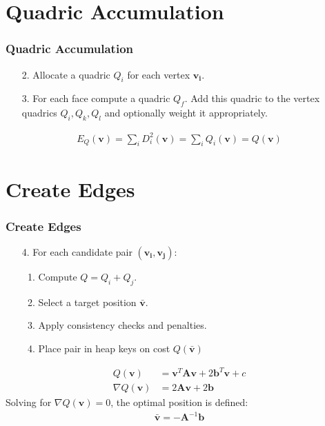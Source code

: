 \documentclass[
	10pt,
	t		%
]{beamer}
\begin{document}
\section{Quadric Accumulation}
\begin{frame}
\frametitle{Quadric Accumulation}
\centering
\begin{enumerate}
\item [2.] Allocate a quadric $Q_i$ for each vertex $\mathbf{v_i}$.
\item [3.] For each face compute a quadric $Q_f$. Add this quadric to the vertex quadrics $Q_i, Q_k, Q_l$ and optionally weight it appropriately.
\end{enumerate}
\begin{align}
E_Q(\mathbf{v}) = \sum_{i} D_i^2(\mathbf{v}) = \sum_{i} Q_i(\mathbf{v}) = Q(\mathbf{v})
\end{align}
\end{frame}

\section{Create Edges}
\begin{frame}
\frametitle{Create Edges}
\centering
\begin{enumerate}
\item [4.] For each candidate pair $(\mathbf{v_i}, \mathbf{v_j})$:
\begin{enumerate}
\item Compute $Q = Q_i + Q_j$.
\item Select a target position $\mathbf{\bar{v}}$.
\item Apply consistency checks and penalties.
\item Place pair in heap keys on cost $Q(\mathbf{\bar{v}})$
\end{enumerate}
\end{enumerate}

\begin{align}
Q(\mathbf{v}) &= \mathbf{v}^T\mathbf{A}\mathbf{v} + 2\mathbf{b}^T\mathbf{v} + c\\
\nabla Q(\mathbf{v}) &= 2\mathbf{A}\mathbf{v} + 2 \mathbf{b}
\end{align}
Solving for $\nabla Q(\mathbf{v}) = 0$, the optimal position is defined:
\begin{align}
\mathbf{\bar{v}} = -\mathbf{A}^{-1}\mathbf{b}
\label{v_bar}
\end{align}

\end{frame}
\end{document}
